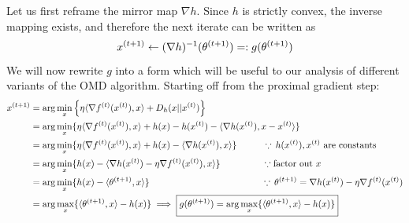 Let us first reframe the mirror map $\nabla h$. Since $h$ is strictly convex, the inverse mapping exists, and therefore the next iterate can be written as \begin{equation}\label{eqn:x^{(t)}+1_g}
    x^{(t+1)} \gets (\nabla h)^{-1}(\theta^{(t+1)}) =: g(\theta^{(t+1)})
\end{equation} We will now rewrite $g$ into a form which will be useful to our analysis of different variants of the OMD algorithm. Starting off from the proximal gradient step:
\begin{align*}
    x^{(t+1)} &= \arg \min_{x} \left\{\eta \langle \nabla f^{(t)}(x^{(t)}), x\rangle + D_h(x || x^{(t)})\right\}\\
    &=\arg\min_x \{ \eta \langle \nabla f^{(t)}(x^{(t)}), x \rangle + h(x) - h(x^{(t)}) - \langle \nabla h(x^{(t)}), x - x^{(t)} \rangle \}\\
    &=\arg\min_x \{ \eta \langle \nabla f^{(t)}(x^{(t)}), x \rangle + h(x) - \langle \nabla h(x^{(t)}), x \rangle \} \hspace{1cm}\because \,h(x^{(t)}), x^{(t)} \text{ are constants}\\
    &=\arg\min_x \{ h(x) - \langle \nabla h(x^{(t)}) - \eta \nabla f^{(t)}(x^{(t)}), x \rangle \} \hspace{1.6cm}\because \text{factor out }x\\
    &=\arg\min_x \{ h(x) - \langle \theta^{(t+1)}, x \rangle \}\hspace{4.3cm}\because\,\theta^{(t+1)} =\nabla h(x^{(t)}) - \eta \nabla f^{(t)}(x^{(t)})\\
    &=\arg\max_{x} \{\langle \theta^{(t+1)}, x \rangle - h(x)\} \implies \boxed{g(\theta^{(t+1)}) = \arg\max_x \{\langle \theta^{(t+1)}, x \rangle - h(x)\}}
\end{align*}

